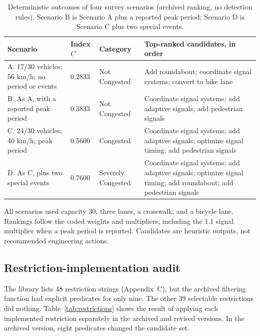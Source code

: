 \documentclass[11pt]{article}
\begin{document}
\begin{table}[!htbp]
\centering\small
\caption{Deterministic outcomes of four survey scenarios (archived ranking, no detection rules). Scenario B is Scenario A plus a reported peak period; Scenario D is Scenario C plus two special events.}
\label{tab:scenarios}
\begin{tabularx}{\textwidth}{P{0.25\textwidth} P{0.09\textwidth} P{0.15\textwidth} Y}
\toprule
Scenario & Index $C$ & Category & Top-ranked candidates, in order \\
\midrule
A. 17/30 vehicles; 56 km/h; no period or events & 0.2833 & Not Congested & Add roundabout; coordinate signal systems; convert to bike lane \\
B. As A, with a reported peak period & 0.3833 & Not Congested & Coordinate signal systems; add adaptive signals; add pedestrian signals \\
C. 24/30 vehicles; 40 km/h; peak period & 0.5600 & Congested & Coordinate signal systems; add adaptive signals; optimize signal timing; add pedestrian signals \\
D. As C, plus two special events & 0.7600 & Severely Congested & Coordinate signal systems; add adaptive signals; optimize signal timing; add roundabout; add pedestrian signals \\
\bottomrule
\end{tabularx}
\vspace{0.75em}
\noindent\footnotesize All scenarios used capacity 30, three lanes, a crosswalk, and a bicycle lane. Rankings follow the coded weights and multipliers, including the 1.1 signal multiplier when a peak period is reported. Candidates are heuristic outputs, not recommended engineering actions.\par
\end{table}

\subsection{Restriction-implementation audit}
\label{sec:restriction-audit}
The library lists 48 restriction strings (Appendix~C), but the archived filtering function had explicit predicates for only nine. The other 39 selectable restrictions did nothing. Table~\ref{tab:restrictions} shows the result of applying each implemented restriction separately in the archived and revised versions. In the archived version, eight predicates changed the candidate set.
\end{document}

